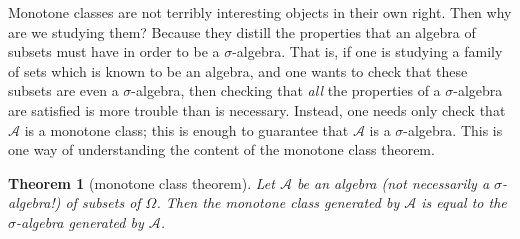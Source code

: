 \documentclass[a4paper]{scrartcl}
\theoremstyle{definition}
\theoremstyle{plain}
\newtheorem{theorem}{Theorem}[section]
\theoremstyle{remark}
\begin{document}
Monotone classes are not terribly interesting objects in their own right. Then why are we studying them? Because they distill the properties that an algebra of subsets must have in order to be a $\sigma$-algebra. That is, if one is studying a family of sets which is known to be an algebra, and one wants to check that these subsets are even a $\sigma$-algebra, then checking that \emph{all} the properties of a $\sigma$-algebra are satisfied is more trouble than is necessary. Instead, one needs only check that $\mathcal{A}$ is a monotone class; this is enough to guarantee that $\mathcal{A}$ is a $\sigma$-algebra. This is one way of understanding the content of the monotone class theorem.

\begin{theorem}[monotone class theorem]
  \label{thm:monotoneclasstheorem}
  Let $\mathcal{A}$ be an algebra (not necessarily a $\sigma$-algebra!) of subsets of $\Omega$. Then the monotone class generated by $\mathcal{A}$ is equal to the $\sigma$-algebra generated by $\mathcal{A}$.
\end{theorem}
\end{document}
